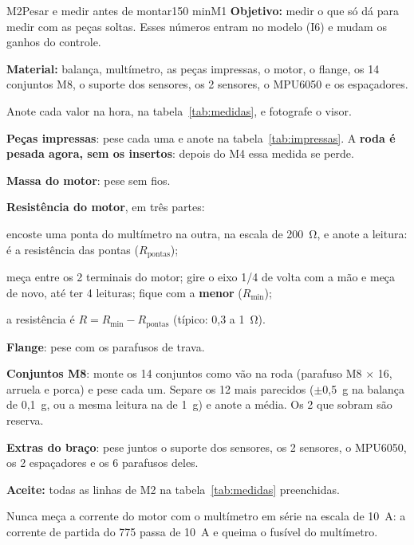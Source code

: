 \documentclass[11pt,a4paper]{article}
\newcommand{\objetivo}[1]{{\color{azul!70!black}\textbf{Objetivo:} #1}\par\smallskip}
\begin{document}
\begin{tarefa}{M2}{Pesar e medir antes de montar}{1}{50 min}{M1}
\objetivo{medir o que só dá para medir com as peças soltas. Esses números entram no modelo
(I6) e mudam os ganhos do controle.}
\textbf{Material:} balança, multímetro, as peças impressas, o motor, o flange, os 14
conjuntos M8, o suporte dos sensores, os 2 sensores, o MPU6050 e os espaçadores.

Anote cada valor na hora, na tabela~\ref{tab:medidas}, e fotografe o visor.
\begin{passos}
  \item \textbf{Peças impressas}: pese cada uma e anote na tabela~\ref{tab:impressas}. A
    \textbf{roda é pesada agora, sem os insertos}: depois do M4 essa medida se perde.
  \item \textbf{Massa do motor}: pese sem fios.
  \item \textbf{Resistência do motor}, em três partes:
    \begin{passos}
      \item encoste uma ponta do multímetro na outra, na escala de \qty{200}{\ohm}, e anote a
        leitura: é a resistência das pontas ($R_\text{pontas}$);
      \item meça entre os 2 terminais do motor; gire o eixo 1/4 de volta com a mão e meça de
        novo, até ter 4 leituras; fique com a \textbf{menor} ($R_\text{min}$);
      \item a resistência é $R = R_\text{min} - R_\text{pontas}$ (típico: 0,3 a
        \qty{1}{\ohm}).
    \end{passos}
  \item \textbf{Flange}: pese com os parafusos de trava.
  \item \textbf{Conjuntos M8}: monte os 14 conjuntos como vão na roda (parafuso
    M8 $\times$ 16, arruela e porca) e pese cada um. Separe os 12 mais parecidos ($\pm$0,5~g
    na balança de 0,1~g, ou a mesma leitura na de 1~g) e anote a média. Os 2 que sobram são
    reserva.
  \item \textbf{Extras do braço}: pese juntos o suporte dos sensores, os 2 sensores, o
    MPU6050, os 2 espaçadores e os 6 parafusos deles.
\end{passos}
\textbf{Aceite:} todas as linhas de M2 na tabela~\ref{tab:medidas} preenchidas.
\begin{atencao}
Nunca meça a corrente do motor com o multímetro em série na escala de 10~A: a corrente de
partida do 775 passa de 10~A e queima o fusível do multímetro.
\end{atencao}
\end{tarefa}
\end{document}
